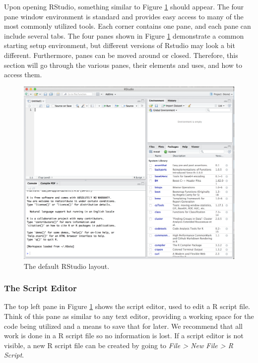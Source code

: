 \documentclass{report}\usepackage[]{graphicx}\usepackage[]{color}
\begin{document}
Upon opening \textsf{RStudio}, something similar to Figure \ref{fig:rstudio} should appear.  The four pane window environment is standard and provides easy access to many of the most commonly utilized tools.  Each corner contains one pane, and each pane can include several tabs.  The four panes shown in Figure \ref{fig:rstudio} demonstrate a common starting setup environment, but different versions of \textsf{Rstudio} may look a bit different.  Furthermore, panes can be moved around or closed.  Therefore, this section will go through the various panes, their elements and uses, and how to access them.    
\begin{figure}[h!]
\centering
\includegraphics[width = 6in]{chapters/chapter_0/rstudio.png}
\caption{The default \textsf{RStudio} layout.  }
\label{fig:rstudio}
\end{figure}

\subsubsection{The Script Editor}
The top left pane in Figure \ref{fig:rstudio} shows the script editor, used to edit a \textsf{R} script file.  Think of this pane as similar to any text editor, providing a working space for the code being utilized and a means to save that for later.  We recommend that all work is done in a \textsf{R} script file so no information is lost.  If a script editor is not visible, a new \textsf{R} script file can be created by going to \textit{File > New File > R Script}.  
\end{document}
